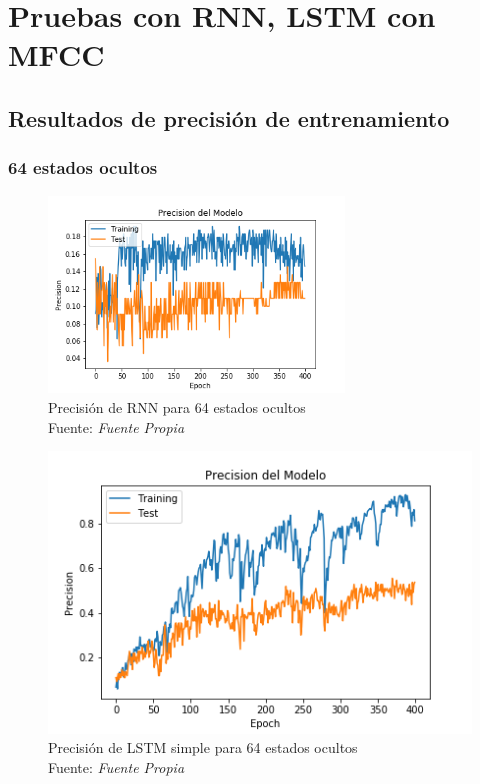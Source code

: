 \section{Pruebas con RNN, LSTM con MFCC}
\subsection{Resultados de precisión de entrenamiento}\label{precision}
\subsubsection{64 estados ocultos}\label{64stateprec}
\begin{figure}[H]
	\centering
	\includegraphics[width=0.7\textwidth]{Figures/rnn_64_prec}
	\caption{Precisión de RNN para 64 estados ocultos\\ Fuente: {\textit{Fuente Propia}}}
	\label{RNNSIMPLE64}
\end{figure} 
\begin{figure}[H]
	\centering
	\includegraphics[width=0.7\linewidth]{Figures/lstm13_64_prec}
	\caption{Precisión de LSTM simple para 64 estados ocultos\\ Fuente: {\textit{Fuente Propia}}}
	\label{fig:lstm1364prec}
\end{figure}


